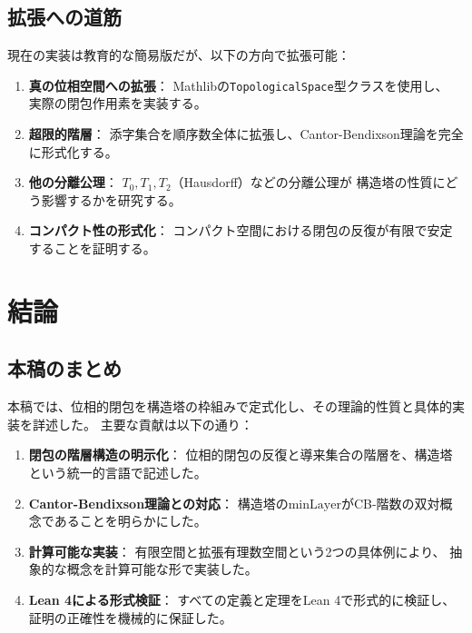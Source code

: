 \documentclass[a4paper,12pt]{ltjsarticle}
\theoremstyle{definition}
\begin{document}
\subsection{拡張への道筋}

現在の実装は教育的な簡易版だが、以下の方向で拡張可能：

\begin{enumerate}
\item \textbf{真の位相空間への拡張}：
  Mathlibの\texttt{TopologicalSpace}型クラスを使用し、
  実際の閉包作用素を実装する。

\item \textbf{超限的階層}：
  添字集合を順序数全体に拡張し、Cantor-Bendixson理論を完全に形式化する。

\item \textbf{他の分離公理}：
  $T_0, T_1, T_2$（Hausdorff）などの分離公理が
  構造塔の性質にどう影響するかを研究する。

\item \textbf{コンパクト性の形式化}：
  コンパクト空間における閉包の反復が有限で安定することを証明する。
\end{enumerate}

\section{結論}

\subsection{本稿のまとめ}

本稿では、位相的閉包を構造塔の枠組みで定式化し、その理論的性質と具体的実装を詳述した。
主要な貢献は以下の通り：

\begin{enumerate}
\item \textbf{閉包の階層構造の明示化}：
  位相的閉包の反復と導来集合の階層を、構造塔という統一的言語で記述した。

\item \textbf{Cantor-Bendixson理論との対応}：
  構造塔の$\mathrm{minLayer}$がCB-階数の双対概念であることを明らかにした。

\item \textbf{計算可能な実装}：
  有限空間と拡張有理数空間という2つの具体例により、
  抽象的な概念を計算可能な形で実装した。

\item \textbf{Lean 4による形式検証}：
  すべての定義と定理をLean 4で形式的に検証し、
  証明の正確性を機械的に保証した。
\end{enumerate}
\end{document}
